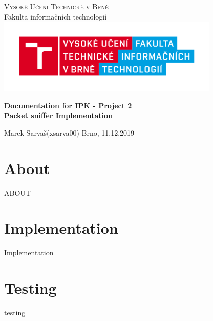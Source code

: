 \documentclass{article}
\begin{document}

	\begin{titlepage}
		\begin{center}
			\textsc{\Huge Vysoké Učení Technické v Brně} \\[0.7cm]
			{\Huge Fakulta informačních technologií}
			\center\includegraphics[width=0.5\linewidth]{./logo.png}

			\vspace{5cm}

			\textbf{{\Huge Documentation for IPK - Project 2}}\\[0.4cm]
			\textbf{{\LARGE Packet sniffer Implementation}}\\[0.4cm]
	
			
		\end{center}
		\vfill

		\begin{flushleft}
			\begin{Large}
				
				Marek Sarvaš\hspace{37px}(xsarva00)\hspace{19px} 
			\hfill
			Brno, 11.12.2019
			\end{Large}
		\end{flushleft}

	\end{titlepage}


	\tableofcontents
	\newpage


	\section{About}
	\large{ABOUT}
	\newpage
	\section{Implementation}
	Implementation

	\section{Testing}
	testing
	

	
	

	
\end{document}
